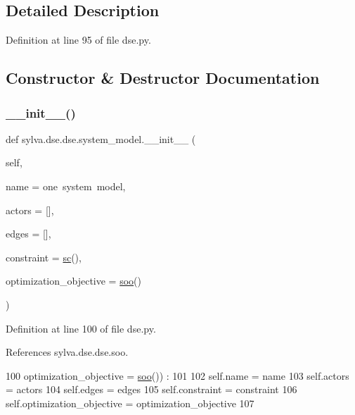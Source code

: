 \subsection{Detailed Description}


Definition at line 95 of file dse.\+py.



\subsection{Constructor \& Destructor Documentation}
\mbox{\label{classsylva_1_1dse_1_1dse_1_1system__model_a1d139488c7dc335da838c976cd35f748}} 
\subsubsection{\texorpdfstring{\+\_\+\+\_\+init\+\_\+\+\_\+()}{\_\_init\_\_()}}
{\footnotesize\ttfamily def sylva.\+dse.\+dse.\+system\+\_\+model.\+\_\+\+\_\+init\+\_\+\+\_\+ (\begin{DoxyParamCaption}\item[{}]{self,  }\item[{}]{name = {\ttfamily \textquotesingle{}one~system~model\textquotesingle{}},  }\item[{}]{actors = {\ttfamily \mbox{[}\mbox{]}},  }\item[{}]{edges = {\ttfamily \mbox{[}\mbox{]}},  }\item[{}]{constraint = {\ttfamily \hyperlink{namespacesylva_1_1dse_1_1dse_ac2d9fdcc3f7fd0bad1900fa0a813dff4}{sc}()},  }\item[{}]{optimization\+\_\+objective = {\ttfamily \hyperlink{namespacesylva_1_1dse_1_1dse_ab54fbae03bc2c432fecd4486e623af71}{soo}()} }\end{DoxyParamCaption})}



Definition at line 100 of file dse.\+py.



References sylva.\+dse.\+dse.\+soo.


\begin{DoxyCode}
100     optimization\_objective = \hyperlink{namespacesylva_1_1dse_1_1dse_ab54fbae03bc2c432fecd4486e623af71}{soo}()) :
101 
102     self.name = name
103     self.actors = actors
104     self.edges = edges
105     self.constraint = constraint
106     self.optimization\_objective = optimization\_objective
107 
\end{DoxyCode}


